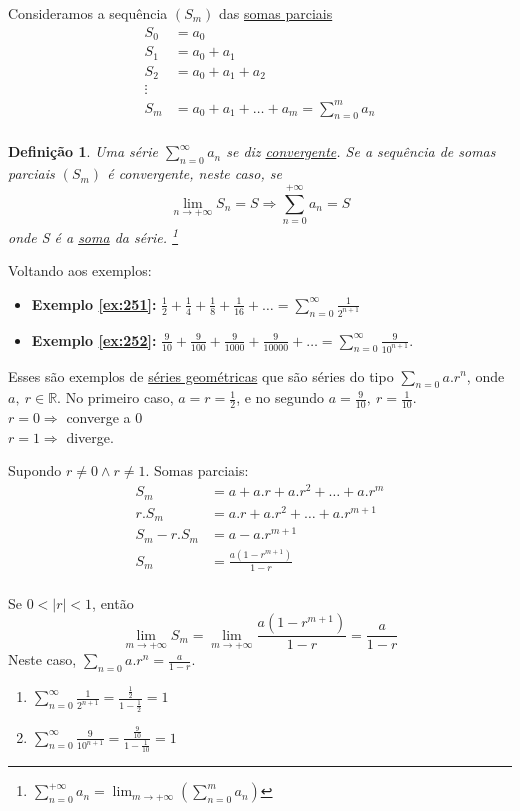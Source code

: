 \documentclass[12pt,openany]{book}
\newtheorem{definition}{Definição}[section]
\begin{document}
Consideramos a sequência $(S_m)$ das \underline{somas parciais}
\begin{align*}
S_0 &= a_0 \\
S_1 &= a_0 + a_1 \\
S_2 &= a_0 + a_1 + a_2 \\
\vdots \\
S_m &= a_0 + a_1 + \hdots + a_m = \sum_{n=0}^m a_n \\
\end{align*}


\begin{definition}
Uma série $\sum_{n=0}^{\infty} a_n$ se diz \underline{convergente}. Se a sequência de somas parciais $(S_m)$ é convergente, neste caso, se $$ \lim_{n \rightarrow +\infty} S_n = S \Rightarrow \sum_{n=0}^{+\infty} a_n = S $$ onde S é a \underline{soma} da série. \footnote{$\displaystyle{\sum_{n=0}^{+\infty} a_n = \lim_{m \rightarrow +\infty} \left(\sum_{n=0}^m a_n\right)}$ }
\end{definition}


Voltando aos exemplos:
\begin{itemize}
\item \textbf{Exemplo \ref{ex:251}: } $\displaystyle{\frac{1}{2} + \frac{1}{4} + \frac{1}{8} + \frac{1}{16} + \hdots = \sum_{n=0}^{\infty} \frac{1}{2^{n+1}}}$
\item \textbf{Exemplo \ref{ex:252}: } $\displaystyle{\frac{9}{10} + \frac{9}{100} + \frac{9}{1000} + \frac{9}{10000} + \hdots = \sum_{n=0}^{\infty} \frac{9}{10^{n+1}}}$.
\end{itemize}
Esses são exemplos de \underline{séries geométricas} que são séries do tipo $\displaystyle{\sum_{n=0} a.r^n}$, onde $a, \ r \in \mathds{R}$. No primeiro caso, $a=r=\frac{1}{2}$, e no segundo $a = \frac{9}{10}, \ r = \frac{1}{10}$. \\ $r = 0 \Rightarrow $ converge a 0 \\ $r = 1 \Rightarrow $ diverge.

Supondo $r \neq 0 \land r \neq 1$. Somas parciais:
\begin{align*}
S_m &= a + a.r + a.r^2 + \hdots + a.r^m \\
r.S_m &= a.r + a.r^2 + \hdots + a.r^{m+1} \\
S_m - r.S_m &= a - a.r^{m+1} \\
S_m &= \frac{a(1-r^{m+1})}{1-r} \\
\end{align*}

Se $0 < |r| < 1$, então $$\lim_{m \rightarrow +\infty} S_m = \lim_{m \rightarrow +\infty} \frac{a(1-r^{m+1})}{1-r} = \frac{a}{1-r}$$ Neste caso, $\displaystyle{\sum_{n=0} a.r^n = \frac{a}{1-r}}$.
\begin{enumerate}
\item $\sum_{n=0}^{\infty} \frac{1}{2^{n+1}} = \frac{\frac{1}{2}}{1-\frac{1}{2}} = 1$
\item $\sum_{n=0}^{\infty} \frac{9}{10^{n+1}} = \frac{\frac{9}{10}}{1-\frac{1}{10}} = 1 $
\end{enumerate}
\end{document}
